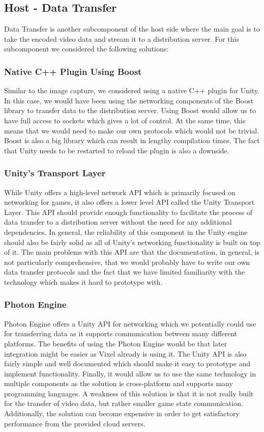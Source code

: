 \subsection{Host - Data Transfer} 
Data Transfer is another subcomponent of the host side where the main goal is to take the encoded video data and stream it to a distribution server. For this subcomponent we considered the following solutions:

\subsubsection{Native C++ Plugin Using Boost}
Similar to the image capture, we considered using a native C++ plugin for Unity. In this case, we would have been using the networking components of the Boost library\cite{boost} to transfer data to the distribution server. Using Boost would allow us to have full access to sockets which gives a lot of control. At the same time, this means that we would need to make our own protocols which would not be trivial. Boost is also a big library which can result in lengthy compilation times. The fact that Unity needs to be restarted to reload the plugin is also a downside. 

\subsubsection{Unity's Transport Layer}
While Unity offers a high-level network API which is primarily focused on networking for games, it also offers a lower level API called the Unity Transport Layer\cite{unity_transportLayer}. This API should provide enough functionality to facilitate the process of data transfer to a distribution server without the need for any additional dependencies. In general, the reliability of this component in the Unity engine should also be fairly solid as all of Unity's networking functionality is built on top of it. The main problems with this API are that the documentation, in general, is not particularly comprehensive, that we would probably have to write our own data transfer protocols and the fact that we have limited familiarity with the technology which makes it hard to prototype with. 

\subsubsection{Photon Engine}
Photon Engine\cite{photon_homepage} offers a Unity API for networking which we potentially could use for transferring data as it supports communication between many different platforms. The benefits of using the Photon Engine would be that later integration might be easier as Vixel already is using it. The Unity API is also fairly simple and well documented which should make it easy to prototype and implement functionality.
Finally, it would allow us to use the same technology in multiple components as the solution is cross-platform and supports many programming languages. A weakness of this solution is that it is not really built for the transfer of video data, but rather smaller game state communication. Additionally, the solution can become expensive in order to get satisfactory performance from the provided cloud servers.  

